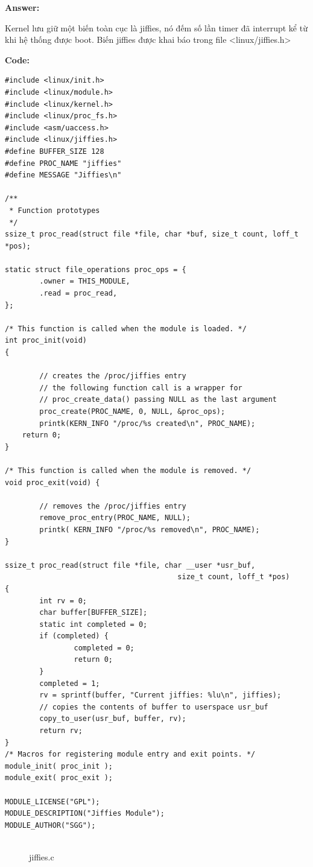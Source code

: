 \documentclass{article}
\newenvironment{answer}{
    {\bf Answer:} \sf \begingroup\color{black}
}{\endgroup}%
\begin{document}
\begin{shaded}
    \begin{answer}
        Kernel lưu giữ một biến toàn cục là jiffies, nó đếm số lần timer đã interrupt kể từ khi hệ thống được boot. Biến jiffies được khai báo trong file <linux/jiffies.h>
    \end{answer}

    \textbf{Code: }
    \begin{lstlisting}
#include <linux/init.h>
#include <linux/module.h>
#include <linux/kernel.h>
#include <linux/proc_fs.h>
#include <asm/uaccess.h>
#include <linux/jiffies.h>
#define BUFFER_SIZE 128
#define PROC_NAME "jiffies"
#define MESSAGE "Jiffies\n"

/**
 * Function prototypes
 */
ssize_t proc_read(struct file *file, char *buf, size_t count, loff_t *pos);

static struct file_operations proc_ops = {
        .owner = THIS_MODULE,
        .read = proc_read,
};

/* This function is called when the module is loaded. */
int proc_init(void)
{

        // creates the /proc/jiffies entry
        // the following function call is a wrapper for
        // proc_create_data() passing NULL as the last argument
        proc_create(PROC_NAME, 0, NULL, &proc_ops);
        printk(KERN_INFO "/proc/%s created\n", PROC_NAME);
	return 0;
}

/* This function is called when the module is removed. */
void proc_exit(void) {

        // removes the /proc/jiffies entry
        remove_proc_entry(PROC_NAME, NULL);
        printk( KERN_INFO "/proc/%s removed\n", PROC_NAME);
}

ssize_t proc_read(struct file *file, char __user *usr_buf, 
                                        size_t count, loff_t *pos)
{
        int rv = 0;
        char buffer[BUFFER_SIZE];
        static int completed = 0;
        if (completed) {
                completed = 0;
                return 0;
        }
        completed = 1;
        rv = sprintf(buffer, "Current jiffies: %lu\n", jiffies);
        // copies the contents of buffer to userspace usr_buf
        copy_to_user(usr_buf, buffer, rv);
        return rv;
}
/* Macros for registering module entry and exit points. */
module_init( proc_init );
module_exit( proc_exit );

MODULE_LICENSE("GPL");
MODULE_DESCRIPTION("Jiffies Module");
MODULE_AUTHOR("SGG");


    \end{lstlisting}
\end{shaded}
\begin{figure}[h]
    \caption{jiffies.c}
\end{figure}
\end{document}
